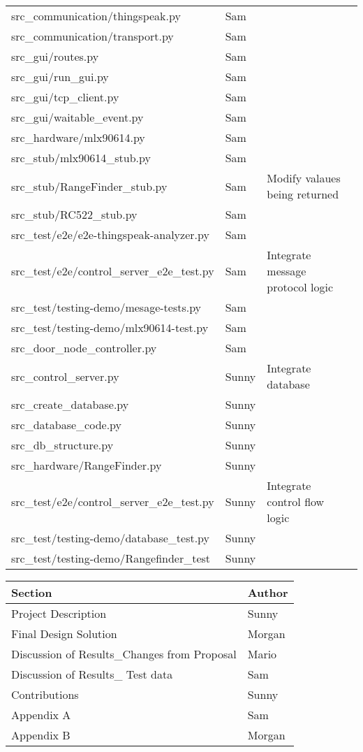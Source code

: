\begin{center}
\begin{tabular}{llp{3cm}l}
src\_communication/thingspeak.py & Sam&\\
src\_communication/transport.py & Sam&\\
src\_gui/routes.py & Sam&\\
src\_gui/run\_gui.py & Sam&\\
src\_gui/tcp\_client.py & Sam&\\
src\_gui/waitable\_event.py & Sam&\\
src\_hardware/mlx90614.py & Sam&\\
src\_stub/mlx90614\_stub.py & Sam&\\
src\_stub/RangeFinder\_stub.py & Sam & Modify valaues being returned\\
src\_stub/RC522\_stub.py & Sam&\\
src\_test/e2e/e2e-thingspeak-analyzer.py & Sam&\\
src\_test/e2e/control\_server\_e2e\_test.py & Sam& Integrate message protocol logic\\
src\_test/testing-demo/mesage-tests.py & Sam&\\
src\_test/testing-demo/mlx90614-test.py & Sam&\\
src\_door\_node\_controller.py & Sam&\\
src\_control\_server.py & Sunny & Integrate database \\
src\_create\_database.py & Sunny&\\
src\_database\_code.py & Sunny&\\
src\_db\_structure.py & Sunny&\\
src\_hardware/RangeFinder.py & Sunny&\\
src\_test/e2e/control\_server\_e2e\_test.py & Sunny& Integrate control flow logic\\
src\_test/testing-demo/database\_test.py & Sunny&\\
src\_test/testing-demo/Rangefinder\_test & Sunny&\\
\end{tabular}
\end{center}

\begin{center}
\begin{tabular}{ll}
Section & Author\\
\hline
Project Description &  Sunny\\
Final Design Solution &   Morgan\\
Discussion of Results\_Changes from Proposal &   Mario\\
Discussion of Results\_ Test data &   Sam\\
Contributions &   Sunny\\
Appendix A &   Sam\\
Appendix B &   Morgan\\
\end{tabular}
\end{center}
